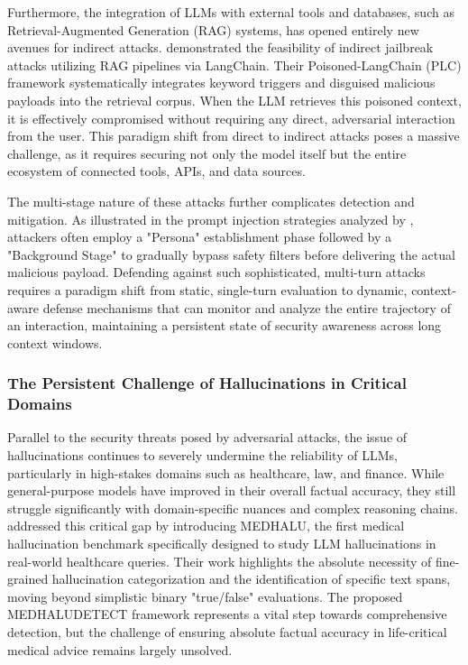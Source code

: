 \documentclass[11pt,a4paper]{article}
\begin{document}
Furthermore, the integration of LLMs with external tools and databases, such as Retrieval-Augmented Generation (RAG) systems, has opened entirely new avenues for indirect attacks. \cite{Wang_2024_LLMs} demonstrated the feasibility of indirect jailbreak attacks utilizing RAG pipelines via LangChain. Their Poisoned-LangChain (PLC) framework systematically integrates keyword triggers and disguised malicious payloads into the retrieval corpus. When the LLM retrieves this poisoned context, it is effectively compromised without requiring any direct, adversarial interaction from the user. This paradigm shift from direct to indirect attacks poses a massive challenge, as it requires securing not only the model itself but the entire ecosystem of connected tools, APIs, and data sources.

The multi-stage nature of these attacks further complicates detection and mitigation. As illustrated in the prompt injection strategies analyzed by \cite{Lee_2025_LLM}, attackers often employ a "Persona" establishment phase followed by a "Background Stage" to gradually bypass safety filters before delivering the actual malicious payload. Defending against such sophisticated, multi-turn attacks requires a paradigm shift from static, single-turn evaluation to dynamic, context-aware defense mechanisms that can monitor and analyze the entire trajectory of an interaction, maintaining a persistent state of security awareness across long context windows.

\subsubsection{The Persistent Challenge of Hallucinations in Critical Domains}

Parallel to the security threats posed by adversarial attacks, the issue of hallucinations continues to severely undermine the reliability of LLMs, particularly in high-stakes domains such as healthcare, law, and finance. While general-purpose models have improved in their overall factual accuracy, they still struggle significantly with domain-specific nuances and complex reasoning chains. \cite{Agarwal_2024_Medhalu} addressed this critical gap by introducing MEDHALU, the first medical hallucination benchmark specifically designed to study LLM hallucinations in real-world healthcare queries. Their work highlights the absolute necessity of fine-grained hallucination categorization and the identification of specific text spans, moving beyond simplistic binary "true/false" evaluations. The proposed MEDHALUDETECT framework represents a vital step towards comprehensive detection, but the challenge of ensuring absolute factual accuracy in life-critical medical advice remains largely unsolved.
\end{document}
